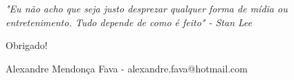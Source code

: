 \documentclass{Alexandre}
\begin{document}
\begin{frame}
    \begin{center}
        \textit{"Eu não acho que seja justo desprezar qualquer forma de mídia ou entretenimento. Tudo depende de como é feito" - Stan Lee}\\
        \vspace{1.5cm}
        \begin{Huge} 
            Obrigado!\\
        \end{Huge}
        \bigskip
        Alexandre Mendonça Fava - \alert{alexandre.fava@hotmail.com}\\
    \end{center}
\end{frame}
\end{document}
